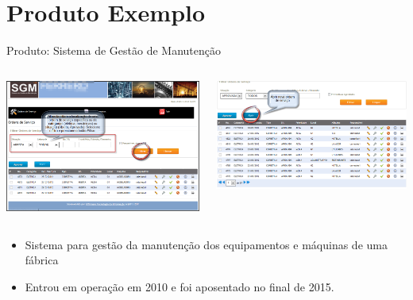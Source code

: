 \section{Produto Exemplo}
\begin{frame}{Produto: Sistema de Gestão de Manutenção}
	\begin{columns}
	  	\begin{column}{0.45\textwidth}
	  		\includegraphics[width=1\textwidth]{imagens/sgm-01}
	  	\end{column}
	  	\begin{column}{0.45\textwidth}
	  		\includegraphics[width=1\textwidth]{imagens/sgm-02}
	  	\end{column}
	\end{columns}

	\begin{itemize}
		\item Sistema para gestão da manutenção dos equipamentos e máquinas de uma fábrica
		\item Entrou em operação em 2010 e foi aposentado no final de 2015.
	\end{itemize}


\end{frame}
